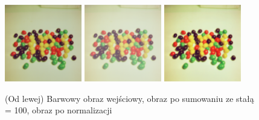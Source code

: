 \documentclass[final,a4paper,openany,12pt]{mwbk}
\begin{document}
\begin{figure}[H]
	\begin{center}
		\includegraphics[width=0.3\textwidth]{2/2Color_Const_Sum_Original}
		\includegraphics[width=0.3\textwidth]{2/2Color_Const_Sum_Result}
		\includegraphics[width=0.3\textwidth]{2/2Color_Const_Sum_Result_Norm}
	\end{center}
	\caption{(Od lewej) Barwowy obraz wejściowy, obraz po sumowaniu ze stałą = 100, obraz po normalizacji }
\end{figure}
\end{document}
